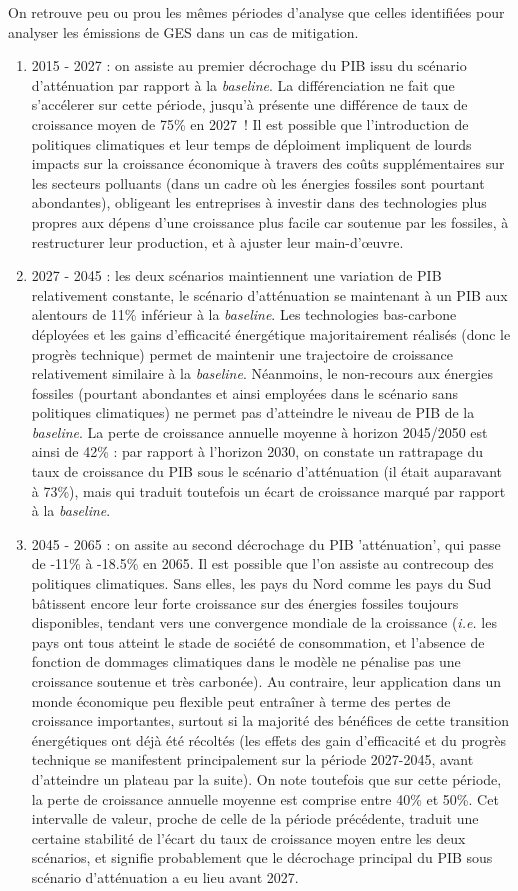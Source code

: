 \documentclass[a4,11pt]{aleph-notas}
\begin{document}
On retrouve peu ou prou les mêmes périodes d'analyse que celles identifiées pour analyser les émissions de GES dans un cas de mitigation.
\begin{enumerate}
    \item 2015 - 2027 : on assiste au premier décrochage du PIB issu du scénario d'atténuation par rapport à la \textit{baseline}. La différenciation ne fait que s'accélerer sur cette période, jusqu'à présente une différence de taux de croissance moyen de 75\% en 2027~! Il est possible que l'introduction de politiques climatiques et leur temps de déploiment impliquent de lourds impacts sur la croissance économique à travers des coûts supplémentaires sur les secteurs polluants (dans un cadre où les énergies fossiles sont pourtant abondantes), obligeant les entreprises à investir dans des technologies plus propres aux dépens d'une croissance plus facile car soutenue par les fossiles, à restructurer leur production, et à ajuster leur main-d'œuvre. 
    \item 2027 - 2045 : les deux scénarios maintiennent une variation de PIB relativement constante, le scénario d'atténuation se maintenant à un PIB aux alentours de 11\% inférieur à la \textit{baseline}. Les technologies bas-carbone déployées et les gains d'efficacité énergétique majoritairement réalisés (donc le progrès technique) permet de maintenir une trajectoire de croissance relativement similaire à la \textit{baseline}. Néanmoins, le non-recours aux énergies fossiles (pourtant abondantes et ainsi employées dans le scénario sans politiques climatiques) ne permet pas d'atteindre le niveau de PIB de la \textit{baseline}. La perte de croissance annuelle moyenne à horizon 2045/2050 est ainsi de 42\% : par rapport à l'horizon 2030, on constate un rattrapage du taux de croissance du PIB sous le scénario d'atténuation (il était auparavant à 73\%), mais qui traduit toutefois un écart de croissance marqué par rapport à la \textit{baseline}.
    \item 2045 - 2065 : on assite au second décrochage du PIB 'atténuation', qui passe de -11\% à -18.5\% en 2065. Il est possible que l'on assiste au contrecoup des politiques climatiques. Sans elles, les pays du Nord comme les pays du Sud bâtissent encore leur forte croissance sur des énergies fossiles toujours disponibles, tendant vers une convergence mondiale de la croissance (\textit{i.e.} les pays ont tous atteint le stade de société de consommation, et l'absence de fonction de dommages climatiques dans le modèle ne pénalise pas une croissance soutenue et très carbonée). Au contraire, leur application dans un monde économique peu flexible peut entraîner à terme des pertes de croissance importantes, surtout si la majorité des bénéfices de cette transition énergétiques ont déjà été récoltés (les effets des gain d'efficacité et du progrès technique se manifestent principalement sur la période 2027-2045, avant d'atteindre un plateau par la suite). On note toutefois que sur cette période, la perte de croissance annuelle moyenne est comprise entre 40\% et 50\%. Cet intervalle de valeur, proche de celle de la période précédente, traduit une certaine stabilité de l'écart du taux de croissance moyen entre les deux scénarios, et signifie probablement que le décrochage principal du PIB sous scénario d'atténuation a eu lieu avant 2027.

\end{enumerate}
\end{document}
